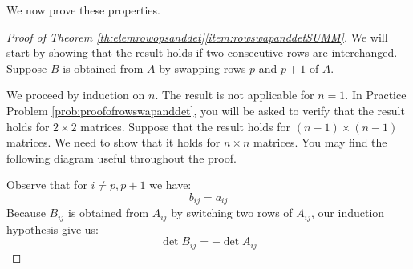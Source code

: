 \documentclass{ximera}
\begin{document}
We now prove these properties.
\begin{proof}[Proof of Theorem \ref{th:elemrowopsanddet}\ref{item:rowswapanddetSUMM}] We will start by showing that the result holds if two consecutive rows are interchanged.  Suppose $B$ is obtained from $A$ by swapping rows $p$ and $p+1$ of $A$. 

We proceed by induction on $n$.  The result is not applicable for $n=1$.  In Practice Problem \ref{prob:proofofrowswapanddet}, you will be asked to verify that the result holds for $2\times 2$ matrices.  Suppose that the result holds for $(n-1)\times (n-1)$ matrices.  We need to show that it holds for $n\times n$ matrices.
You may find the following diagram useful throughout the proof.
\begin{center}
 \end{center} 
 Observe that for $i\neq p, p+1$ we have: $$b_{ij}=a_{ij}$$ Because $B_{ij}$ is obtained from $A_{ij}$ by switching two rows of $A_{ij}$, our induction hypothesis give us:
 $$\det{B_{ij}}=-\det{A_{ij}}$$
 

\end{proof}
\end{document}
